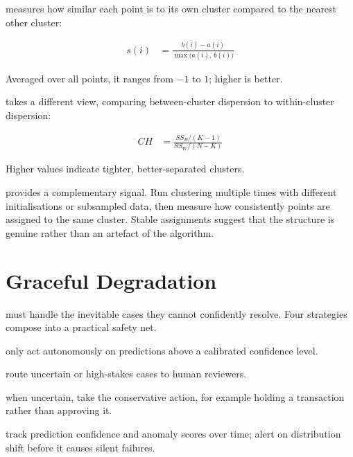  measures how similar each point is to its own cluster compared to the nearest other cluster:

\begin{align*}
    s(i) &= \frac{b(i) - a(i)}{\max\!\bigl(a(i),\, b(i)\bigr)}
\end{align*}

Averaged over all points, it ranges from $-1$ to $1$; higher is better.

 takes a different view, comparing between-cluster dispersion to within-cluster dispersion:

\begin{align*}
    CH &= \frac{SS_B / (K - 1)}{SS_W / (N - K)}
\end{align*}

Higher values indicate tighter, better-separated clusters.

 provides a complementary signal.
Run clustering multiple times with different initialisations or subsampled data, then measure how consistently points are assigned to the same cluster.
Stable assignments suggest that the structure is genuine rather than an artefact of the algorithm.


\section{Graceful Degradation}


 must handle the inevitable cases they cannot confidently resolve.
Four strategies compose into a practical safety net.

 only act autonomously on predictions above a calibrated confidence level.

 route uncertain or high-stakes cases to human reviewers.

 when uncertain, take the conservative action, for example holding a transaction rather than approving it.

 track prediction confidence and anomaly scores over time; alert on distribution shift before it causes silent failures.



